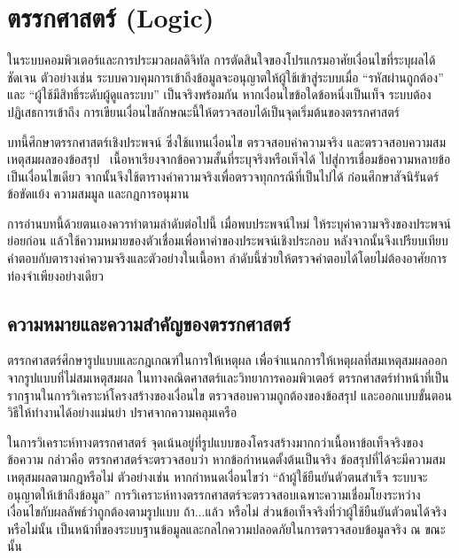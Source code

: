 \chapter{ตรรกศาสตร์ (Logic)}
\label{ch:logic}

ในระบบคอมพิวเตอร์และการประมวลผลดิจิทัล การตัดสินใจของโปรแกรมอาศัยเงื่อนไขที่ระบุผลได้ชัดเจน ตัวอย่างเช่น ระบบควบคุมการเข้าถึงข้อมูลจะอนุญาตให้ผู้ใช้เข้าสู่ระบบเมื่อ ``รหัสผ่านถูกต้อง'' และ ``ผู้ใช้มีสิทธิ์ระดับผู้ดูแลระบบ'' เป็นจริงพร้อมกัน หากเงื่อนไขข้อใดข้อหนึ่งเป็นเท็จ ระบบต้องปฏิเสธการเข้าถึง การเขียนเงื่อนไขลักษณะนี้ให้ตรวจสอบได้เป็นจุดเริ่มต้นของตรรกศาสตร์

บทนี้ศึกษาตรรกศาสตร์เชิงประพจน์ ซึ่งใช้แทนเงื่อนไข ตรวจสอบค่าความจริง และตรวจสอบความสมเหตุสมผลของข้อสรุป~\parencite{enderton2001logic} เนื้อหาเรียงจากข้อความสั้นที่ระบุจริงหรือเท็จได้ ไปสู่การเชื่อมข้อความหลายข้อเป็นเงื่อนไขเดียว จากนั้นจึงใช้ตารางค่าความจริงเพื่อตรวจทุกกรณีที่เป็นไปได้ ก่อนศึกษาสัจนิรันดร์ ข้อขัดแย้ง ความสมมูล และกฎการอนุมาน~\parencite{velleman2019prove, copi2014logic, hurley2024logic}

การอ่านบทนี้ด้วยตนเองควรทำตามลำดับต่อไปนี้ เมื่อพบประพจน์ใหม่ ให้ระบุค่าความจริงของประพจน์ย่อยก่อน แล้วใช้ความหมายของตัวเชื่อมเพื่อหาค่าของประพจน์เชิงประกอบ หลังจากนั้นจึงเปรียบเทียบคำตอบกับตารางค่าความจริงและตัวอย่างในเนื้อหา ลำดับนี้ช่วยให้ตรวจคำตอบได้โดยไม่ต้องอาศัยการท่องจำเพียงอย่างเดียว

\section{ความหมายและความสำคัญของตรรกศาสตร์}
\label{sec:logic-intro}

ตรรกศาสตร์ศึกษารูปแบบและกฎเกณฑ์ในการให้เหตุผล เพื่อจำแนกการให้เหตุผลที่สมเหตุสมผลออกจากรูปแบบที่ไม่สมเหตุสมผล ในทางคณิตศาสตร์และวิทยาการคอมพิวเตอร์ ตรรกศาสตร์ทำหน้าที่เป็นรากฐานในการวิเคราะห์โครงสร้างของเงื่อนไข ตรวจสอบความถูกต้องของข้อสรุป และออกแบบขั้นตอนวิธีให้ทำงานได้อย่างแม่นยำ ปราศจากความคลุมเครือ~\parencite{rosen2019discrete}

ในการวิเคราะห์ทางตรรกศาสตร์ จุดเน้นอยู่ที่รูปแบบของโครงสร้างมากกว่าเนื้อหาข้อเท็จจริงของข้อความ กล่าวคือ ตรรกศาสตร์จะตรวจสอบว่า หากข้อกำหนดตั้งต้นเป็นจริง ข้อสรุปที่ได้จะมีความสมเหตุสมผลตามกฎหรือไม่ ตัวอย่างเช่น หากกำหนดเงื่อนไขว่า ``ถ้าผู้ใช้ยืนยันตัวตนสำเร็จ ระบบจะอนุญาตให้เข้าถึงข้อมูล'' การวิเคราะห์ทางตรรกศาสตร์จะตรวจสอบเฉพาะความเชื่อมโยงระหว่างเงื่อนไขกับผลลัพธ์ว่าถูกต้องตามรูปแบบ ถ้า...แล้ว หรือไม่ ส่วนข้อเท็จจริงที่ว่าผู้ใช้ยืนยันตัวตนได้จริงหรือไม่นั้น เป็นหน้าที่ของระบบฐานข้อมูลและกลไกความปลอดภัยในการตรวจสอบข้อมูลจริง ณ ขณะนั้น

